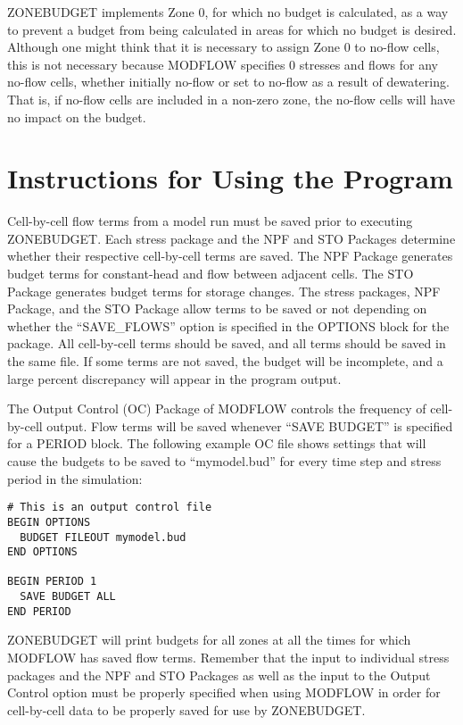 \documentclass[11pt,twoside,twocolumn]{usgsreport}
\begin{document}
ZONEBUDGET implements Zone 0, for which no budget is calculated, as a way to prevent a budget from being calculated in areas for which no budget is desired. Although one might think that it is necessary to assign Zone 0 to no-flow cells, this is not necessary because MODFLOW specifies 0 stresses and flows for any no-flow cells, whether initially no-flow or set to no-flow as a result of dewatering. That is, if no-flow cells are included in a non-zero zone, the no-flow cells will have no impact on the budget.

\section{Instructions for Using the Program}
Cell-by-cell flow terms from a model run must be saved prior to executing ZONEBUDGET. Each stress package and the NPF and STO Packages determine whether their respective cell-by-cell terms are saved. The NPF Package generates budget terms for constant-head and flow between adjacent cells. The STO Package generates budget terms for storage changes.  The stress packages, NPF Package, and the STO Package allow terms to be saved or not depending on whether the ``SAVE\_FLOWS'' option is specified in the OPTIONS block for the package.  All cell-by-cell terms should be saved, and all terms should be saved in the same file. If some terms are not saved, the budget will be incomplete, and a large percent discrepancy will appear in the program output.  

The Output Control (OC) Package of MODFLOW controls the frequency of cell-by-cell output.  Flow terms will be saved whenever ``SAVE BUDGET'' is specified for a PERIOD block.  The following example OC file shows settings that will cause the budgets to be saved to ``mymodel.bud'' for every time step and stress period in the simulation:

\begin{verbatim}
# This is an output control file
BEGIN OPTIONS
  BUDGET FILEOUT mymodel.bud
END OPTIONS

BEGIN PERIOD 1
  SAVE BUDGET ALL
END PERIOD
\end{verbatim}

ZONEBUDGET will print budgets for all zones at all the times for which MODFLOW has saved flow terms. Remember that the input to individual stress packages and the NPF and STO Packages as well as the input to the Output Control option must be properly specified when using MODFLOW in order for cell-by-cell data to be properly saved for use by ZONEBUDGET.
\end{document}
